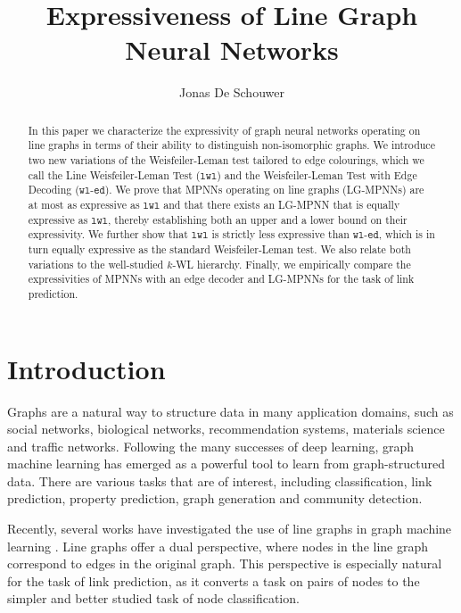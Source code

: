 \documentclass{article}
\title{Expressiveness of Line Graph Neural Networks}
\author{%
    Jonas De Schouwer
}
\newcommand{\wledge}{\texttt{wl-ed}}
\newcommand{\lwl}{\texttt{lwl}}
\begin{document}
\maketitle


\begin{abstract}
    In this paper we characterize the expressivity of graph neural networks operating on line graphs in terms of their ability to distinguish non-isomorphic graphs. We introduce two new variations of the Weisfeiler-Leman test tailored to edge colourings, which we call the Line Weisfeiler-Leman Test ($\lwl$) and the Weisfeiler-Leman Test with Edge Decoding ($\wledge$).
    We prove that MPNNs operating on line graphs (LG-MPNNs) are at most as expressive as $\lwl$ and that there exists an LG-MPNN that is equally expressive as $\lwl$, thereby establishing both an upper and a lower bound on their expressivity. We further show that $\lwl$ is strictly less expressive than $\wledge$, which is in turn equally expressive as the standard Weisfeiler-Leman test. We also relate both variations to the well-studied $k$-WL hierarchy.
    Finally, we empirically compare the expressivities of MPNNs with an edge decoder and LG-MPNNs for the task of link prediction.
\end{abstract}


\section{Introduction}
Graphs are a natural way to structure data in many application domains, such as social networks, biological networks, recommendation systems, materials science and traffic networks.
Following the many successes of deep learning, graph machine learning has emerged as a powerful tool to learn from graph-structured data. There are various tasks that are of interest, including classification, link prediction, property prediction, graph generation and community detection.

Recently, several works have investigated the use of line graphs in graph machine learning \cite{cai2021line,choudhary2021atomistic,liu2021indigo}. Line graphs offer a dual perspective, where nodes in the line graph correspond to edges in the original graph. This perspective is especially natural for the task of link prediction, as it converts a task on pairs of nodes to the simpler and better studied task of node classification.
\end{document}
